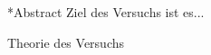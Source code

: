 \documentclass[pdftex, a4paper,11pt, twoside, ngerman]{report}
\begin{document}
  
  
  
  
  
  
  
  
  \begin{chapter}*{Abstract}
    Ziel des Versuchs ist es...
    
    
  \end{chapter}
  
  \tableofcontents
  
  
  
  \begin{chapter}{Theorie des Versuchs}
    \label{chp:Theorie}
    
    
    
  \end{chapter}
         
         
         
\end{document}
